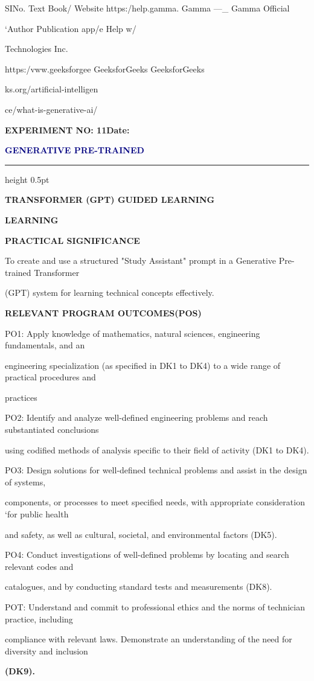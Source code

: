 \documentclass[10pt,a4paper]{article}
\newcommand{\expheading}[2]{%
  \vspace{0.1cm}\noindent\textbf{\large EXPERIMENT NO: #1}\hfill\textbf{Date: #2}\par
}
\newcommand{\exptitle}[1]{%
  \begin{center}\vspace{-2mm}\textcolor{navy}{\fontsize{20}{22}\selectfont\bfseries #1}\end{center}
  \vspace{1mm}\hrule height 0.5pt\vspace{3mm}
}
\begin{document}
\noindent SINo.                 Text Book/ Website    https:/help.gamma.   Gamma —\_         Gamma Official\par
\noindent ‘Author Publication   app/e                                 Help w/\par
{}                                                           Technologies Inc.\par

                           https:/vww.geeksforgee    GeeksforGeeks         GeeksforGeeks\par
\noindent ks.org/artificial-intelligen\par
\noindent ce/what-is-generative-ai/\par
\clearpage
\expheading{11}{\underline{\hspace{1.8cm}}}
\exptitle{GENERATIVE PRE-TRAINED}
\medskip\noindent\textbf{TRANSFORMER (GPT) GUIDED LEARNING}\par
\medskip\noindent\textbf{LEARNING}\par

\medskip\noindent\textbf{PRACTICAL SIGNIFICANCE}\par
\noindent To create and use a structured "Study Assistant" prompt in a Generative Pre-trained Transformer\par
\noindent (GPT) system for learning technical concepts effectively.\par

\medskip\noindent\textbf{RELEVANT PROGRAM OUTCOMES(POS)}\par
\noindent PO1: Apply knowledge of mathematics, natural sciences, engineering fundamentals, and an\par
\noindent engineering specialization (as specified in DK1 to DK4) to a wide range of practical procedures and\par
\noindent practices\par
\noindent PO2: Identify and analyze well-defined engineering problems and reach substantiated conclusions\par
\noindent using codified methods of analysis specific to their field of activity (DK1 to DK4).\par
\noindent PO3: Design solutions for well-defined technical problems and assist in the design of systems,\par
\noindent components, or processes to meet specified needs, with appropriate consideration ‘for public health\par
\noindent and safety, as well as cultural, societal, and environmental factors (DK5).\par
\noindent PO4: Conduct investigations of well-defined problems by locating and search relevant codes and\par
\noindent catalogues, and by conducting standard tests and measurements (DK8).\par
\noindent POT: Understand and commit to professional ethics and the norms of technician practice, including\par
\noindent compliance with relevant laws. Demonstrate an understanding of the need for diversity and inclusion\par
\medskip\noindent\textbf{(DK9).}\par
\end{document}
